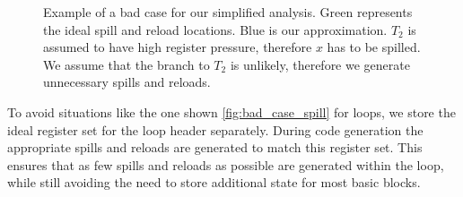 \begin{figure}
\centering
{}
\caption{Example of a bad case for our simplified analysis. Green represents the ideal spill and reload locations. Blue is our approximation. $T_2$ is assumed to have high register pressure, therefore $x$ has to be spilled. We assume that the branch to $T_2$ is unlikely, therefore we generate unnecessary spills and reloads.}
\label{fig:bad_case_spill}
\end{figure}

To avoid situations like the one shown \autoref{fig:bad_case_spill} for loops, we store the ideal register set for the loop header separately. During code generation the appropriate spills and reloads are generated to match this register set. This ensures that as few spills and reloads as possible are generated within the loop, while still avoiding the need to store  additional state for most basic blocks.

